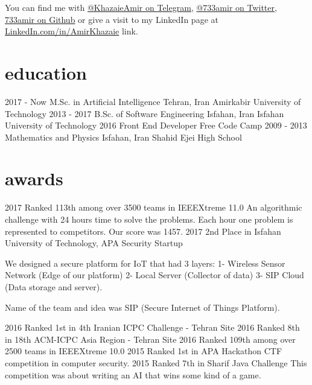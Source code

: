 \documentclass[]{friggeri-cv}
\begin{document}
You can find me with \href{https://t.me/KhazaieAmir}{@KhazaieAmir on Telegram}, \href{https://twitter.com/733amir}{@733amir on Twitter}, \href{https://github.com/733amir}{733amir on Github} or give a visit to my LinkedIn page at \href{https://linkedin.com/in/amirkhazaie}{LinkedIn.com/in/AmirKhazaie} link.

\section{education}

\begin{entrylist}
	  \entry
	{2017 - Now}
	{M.Sc. in Artificial Intelligence}
	{Tehran, Iran}
	{Amirkabir University of Technology}
	  \entry
	{2013 - 2017}
	{B.Sc. of Software Engineering}
	{Isfahan, Iran}
	{Isfahan University of Technology}
	\entry
	{2016}
	{Front End Developer}
	{}
	{Free Code Camp}
  \entry
    {2009 - 2013}
    {Mathematics and Physics}
    {Isfahan, Iran}
    {Shahid Ejei High School}
\end{entrylist}

\section{awards}

\begin{entrylist}
	\entry
	{2017}
	{Ranked 113th among over 3500 teams in IEEEXtreme 11.0}
	{}
	{An algorithmic challenge with 24 hours time to solve the problems. Each hour one problem is represented to competitors. Our score was 1457.}
	\entry
	{2017}
	{2nd Place in Isfahan University of Technology, APA Security Startup}
	{}
	{We designed a secure platform for IoT that had 3 layers:
		1- Wireless Sensor Network (Edge of our platform)
		2- Local Server (Collector of data)
		3- SIP Cloud (Data storage and server).
		
		Name of the team and idea was SIP (Secure Internet of Things Platform).}
	\entry
	{2016}
	{Ranked 1st in 4th Iranian ICPC Challenge - Tehran Site}
	{}
	{}
	\entry
	{2016}
	{Ranked 8th in 18th ACM-ICPC Asia Region - Tehran Site}
	{}
	{}
	\entry
	{2016}
	{Ranked 109th among over 2500 teams in IEEEXtreme 10.0}
	{}
	{}
	\entry
	{2015}
	{Ranked 1st in APA Hackathon}
	{}
	{CTF competition in computer security.}
	\entry
	{2015}
	{Ranked 7th in Sharif Java Challenge}
	{}
	{This competition was about writing an AI that wins some kind of a game.}
\end{entrylist}

\pagebreak
\end{document}
